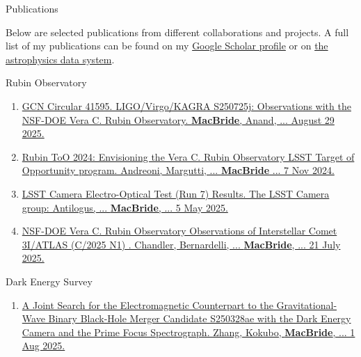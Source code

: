 \documentclass{resume} %
\begin{document}
\begin{rSection}{Publications}


Below are selected publications from different collaborations and projects. A full list of my publications can be found on my \href{https://scholar.google.com/citations?user=XtRTswUAAAAJ&hl=en}{Google Scholar profile} or on \href{https://ui.adsabs.harvard.edu/search/fq=\%7B!type\%3Daqp\%20v\%3D\%24fq_database\%7D&fq_database=(database\%3Aastronomy\%20OR\%20database\%3Aphysics)&p_=0&q=((\%20author\%3A\%22Macbride\%2C\%20Sean\%22)\%20AND\%20year\%3A2019-2150)&sort=date\%20desc\%2C\%20bibcode\%20desc}{the astrophysics data system}.

    \begin{rSubsection}{Rubin Observatory}{}{}{} %
        \begin{enumerate}
        \item \href{https://gcn.nasa.gov/circulars/41595}{GCN Circular 41595. LIGO/Virgo/KAGRA S250725j: Observations with the NSF-DOE Vera C. Rubin Observatory. \textbf{MacBride}, Anand, ... August 29 2025.}
        \item \href{https://arxiv.org/abs/2411.04793}{Rubin ToO 2024: Envisioning the Vera C. Rubin Observatory LSST Target of Opportunity program. Andreoni, Margutti, ... \textbf{MacBride} ... 7 Nov 2024.} 
            \item \href{https://sitcomtn-148.lsst.io/}{LSST Camera Electro-Optical Test (Run 7) Results. The LSST Camera group: Antilogus, ... \textbf{MacBride}, ... 5 May 2025.} 
        \item \href{https://arxiv.org/pdf/2507.13409}{ NSF-DOE Vera C. Rubin Observatory Observations of Interstellar Comet 3I/ATLAS (C/2025 N1) . Chandler, Bernardelli, ... \textbf{MacBride}, ... 21 July 2025.} 
        \end{enumerate}
            
    \end{rSubsection} 
    
    \begin{rSubsection}{Dark Energy Survey}{}{}{} %
        \begin{enumerate}
            \item \href{https://arxiv.org/abs/2508.00291}{A Joint Search for the Electromagnetic Counterpart to the Gravitational-Wave Binary Black-Hole Merger Candidate S250328ae with the Dark Energy Camera and the Prime Focus Spectrograph. Zhang, Kokubo, \textbf{MacBride}, ... 1 Aug 2025.} 
            

\end{enumerate}
\end{rSubsection}
\end{rSection}
\end{document}
